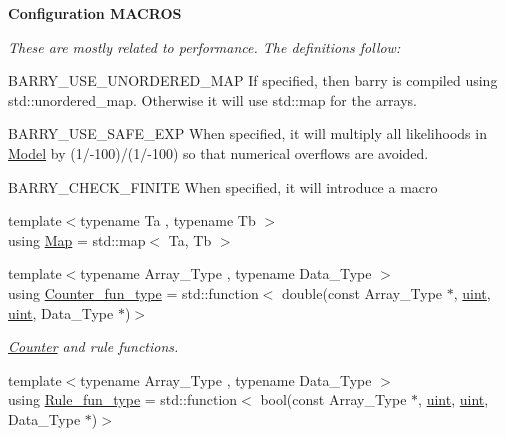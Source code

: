 \begin{Indent}\textbf{ Configuration M\+A\+C\+R\+OS}\par
{\em These are mostly related to performance. The definitions follow\+:


\begin{DoxyItemize}
\item {\ttfamily B\+A\+R\+R\+Y\+\_\+\+U\+S\+E\+\_\+\+U\+N\+O\+R\+D\+E\+R\+E\+D\+\_\+\+M\+AP} If specified, then barry is compiled using {\ttfamily std\+::unordered\+\_\+map}. Otherwise it will use {\ttfamily std\+::map} for the arrays.
\item {\ttfamily B\+A\+R\+R\+Y\+\_\+\+U\+S\+E\+\_\+\+S\+A\+F\+E\+\_\+\+E\+XP} When specified, it will multiply all likelihoods in {\ttfamily \hyperlink{classbarry_1_1_model}{Model}} by (1/-\/100)/(1/-\/100) so that numerical overflows are avoided.
\item {\ttfamily B\+A\+R\+R\+Y\+\_\+\+C\+H\+E\+C\+K\+\_\+\+F\+I\+N\+I\+TE} When specified, it will introduce a macro 
\end{DoxyItemize}}\begin{DoxyCompactItemize}
\item 
{\footnotesize template$<$typename Ta , typename Tb $>$ }\\using \hyperlink{namespacebarry_a979a04835a9855ff2054c383c569c89e}{Map} = std\+::map$<$ Ta, Tb $>$
\end{DoxyCompactItemize}
\end{Indent}
\textbf{ }\par
\begin{DoxyCompactItemize}
\item 
{\footnotesize template$<$typename Array\+\_\+\+Type , typename Data\+\_\+\+Type $>$ }\\using \hyperlink{namespacebarry_abaaae3200da8e4b7faac3c04fe9c3081}{Counter\+\_\+fun\+\_\+type} = std\+::function$<$ double(const Array\+\_\+\+Type $\ast$, \hyperlink{namespacebarry_a11dfc53ddb4672278319aa04f1e09a6c}{uint}, \hyperlink{namespacebarry_a11dfc53ddb4672278319aa04f1e09a6c}{uint}, Data\+\_\+\+Type $\ast$)$>$
\begin{DoxyCompactList}\small\item\em \hyperlink{classbarry_1_1_counter}{Counter} and rule functions. \end{DoxyCompactList}\item 
{\footnotesize template$<$typename Array\+\_\+\+Type , typename Data\+\_\+\+Type $>$ }\\using \hyperlink{namespacebarry_aefd7e6d4ba228e2ce1074d075c512178}{Rule\+\_\+fun\+\_\+type} = std\+::function$<$ bool(const Array\+\_\+\+Type $\ast$, \hyperlink{namespacebarry_a11dfc53ddb4672278319aa04f1e09a6c}{uint}, \hyperlink{namespacebarry_a11dfc53ddb4672278319aa04f1e09a6c}{uint}, Data\+\_\+\+Type $\ast$)$>$
\end{DoxyCompactItemize}

